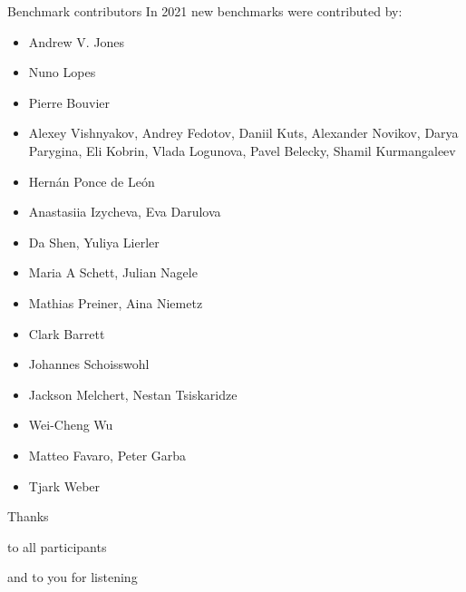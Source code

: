 \documentclass[table]{beamer}
\def\emph#1{\textcolor{MYblue}{#1}}
\begin{document}
\begin{frame}[shrink=0.95]{Benchmark contributors}
  In 2021 \emph{new benchmarks} were contributed by:

  \small
  \begin{itemize}
  \item Andrew V. Jones
  \item Nuno Lopes
  \item Pierre Bouvier
  \item Alexey Vishnyakov, Andrey Fedotov, Daniil Kuts, Alexander Novikov, Darya Parygina, Eli Kobrin, Vlada Logunova, Pavel Belecky, Shamil Kurmangaleev
  \item Hernán Ponce de León
  \item Anastasiia Izycheva, Eva Darulova
  \item Da Shen, Yuliya Lierler
  \item Maria A Schett, Julian Nagele
  \item Mathias Preiner, Aina Niemetz
  \item Clark Barrett
  \item Johannes Schoisswohl
  \item Jackson Melchert, Nestan Tsiskaridze
  \item Wei-Cheng Wu
  \item Matteo Favaro, Peter Garba
  \item Tjark Weber
  \end{itemize}
\end{frame}

\begin{frame}

  \begin{center}
    \Large\emph{Thanks}
  \end{center}
  
  \begin{center}
    to all participants
  \end{center}

  \bigskip
  \pause
  

  \begin{center}
    and to you for listening
  \end{center}

\end{frame}
\end{document}
